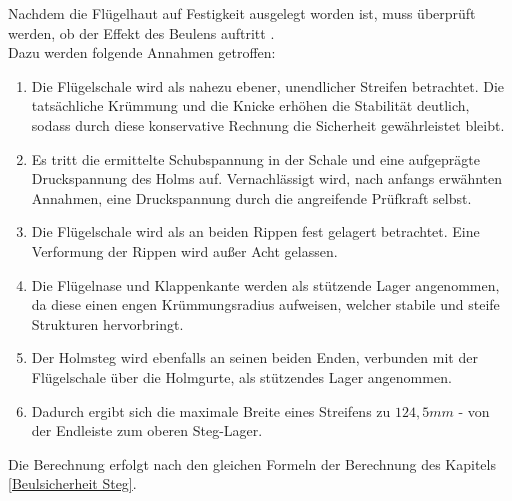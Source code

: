 Nachdem die Flügelhaut auf Festigkeit ausgelegt worden ist, muss überprüft werden, ob der Effekt des Beulens auftritt \cite{item1}.\\

\noindent Dazu werden folgende Annahmen getroffen:

\begin{enumerate}
	\item Die Flügelschale wird als nahezu ebener, unendlicher Streifen betrachtet. Die tatsächliche Krümmung und die Knicke erhöhen die Stabilität deutlich, sodass durch diese konservative Rechnung die Sicherheit gewährleistet bleibt.
	\item Es tritt die ermittelte Schubspannung in der Schale und eine aufgeprägte Druckspannung des Holms auf. Vernachlässigt wird, nach anfangs erwähnten Annahmen, eine Druckspannung durch die angreifende Prüfkraft selbst.
	\item Die Flügelschale wird als an beiden Rippen fest gelagert betrachtet. Eine Verformung der Rippen wird außer Acht gelassen.
	\item Die Flügelnase und Klappenkante werden als stützende Lager angenommen, da diese einen engen Krümmungsradius aufweisen, welcher stabile und steife Strukturen hervorbringt.
	\item Der Holmsteg wird ebenfalls an seinen beiden Enden, verbunden mit der Flügelschale über die Holmgurte, als stützendes Lager angenommen.
	\item Dadurch ergibt sich die maximale Breite eines Streifens zu $124,5 mm$ - von der Endleiste zum oberen Steg-Lager.
\end{enumerate}

\noindent Die Berechnung erfolgt nach den gleichen Formeln der Berechnung des Kapitels \ref{Beulsicherheit Steg}. \\

